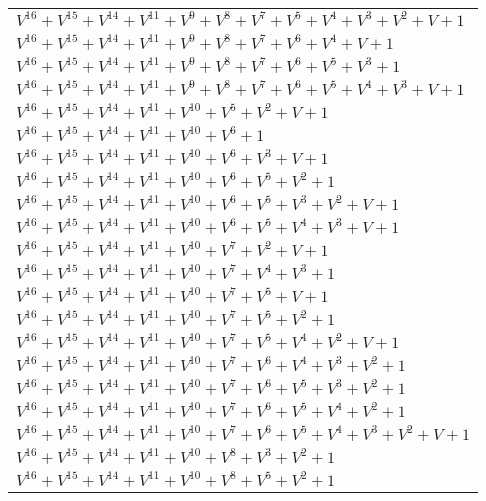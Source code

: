 \documentclass[12pt]{article}
\begin{document}
\begin{adjustwidth}{-4cm}{}
\begin{center}
\begin{longtable}{|l|}
$V^{16}  +V^{15}  +V^{14}  +V^{11}  +V^{9}  +V^{8}  +V^{7}  +V^{5}  +V^{4}  +V^{3}  +V^{2}  + V + 1$ \\
$V^{16}  +V^{15}  +V^{14}  +V^{11}  +V^{9}  +V^{8}  +V^{7}  +V^{6}  +V^{4}  + V + 1$ \\
$V^{16}  +V^{15}  +V^{14}  +V^{11}  +V^{9}  +V^{8}  +V^{7}  +V^{6}  +V^{5}  +V^{3}  + 1$ \\
$V^{16}  +V^{15}  +V^{14}  +V^{11}  +V^{9}  +V^{8}  +V^{7}  +V^{6}  +V^{5}  +V^{4}  +V^{3}  + V + 1$ \\
$V^{16}  +V^{15}  +V^{14}  +V^{11}  +V^{10}  +V^{5}  +V^{2}  + V + 1$ \\
$V^{16}  +V^{15}  +V^{14}  +V^{11}  +V^{10}  +V^{6}  + 1$ \\
$V^{16}  +V^{15}  +V^{14}  +V^{11}  +V^{10}  +V^{6}  +V^{3}  + V + 1$ \\
$V^{16}  +V^{15}  +V^{14}  +V^{11}  +V^{10}  +V^{6}  +V^{5}  +V^{2}  + 1$ \\
$V^{16}  +V^{15}  +V^{14}  +V^{11}  +V^{10}  +V^{6}  +V^{5}  +V^{3}  +V^{2}  + V + 1$ \\
$V^{16}  +V^{15}  +V^{14}  +V^{11}  +V^{10}  +V^{6}  +V^{5}  +V^{4}  +V^{3}  + V + 1$ \\
$V^{16}  +V^{15}  +V^{14}  +V^{11}  +V^{10}  +V^{7}  +V^{2}  + V + 1$ \\
$V^{16}  +V^{15}  +V^{14}  +V^{11}  +V^{10}  +V^{7}  +V^{4}  +V^{3}  + 1$ \\
$V^{16}  +V^{15}  +V^{14}  +V^{11}  +V^{10}  +V^{7}  +V^{5}  + V + 1$ \\
$V^{16}  +V^{15}  +V^{14}  +V^{11}  +V^{10}  +V^{7}  +V^{5}  +V^{2}  + 1$ \\
$V^{16}  +V^{15}  +V^{14}  +V^{11}  +V^{10}  +V^{7}  +V^{5}  +V^{4}  +V^{2}  + V + 1$ \\
$V^{16}  +V^{15}  +V^{14}  +V^{11}  +V^{10}  +V^{7}  +V^{6}  +V^{4}  +V^{3}  +V^{2}  + 1$ \\
$V^{16}  +V^{15}  +V^{14}  +V^{11}  +V^{10}  +V^{7}  +V^{6}  +V^{5}  +V^{3}  +V^{2}  + 1$ \\
$V^{16}  +V^{15}  +V^{14}  +V^{11}  +V^{10}  +V^{7}  +V^{6}  +V^{5}  +V^{4}  +V^{2}  + 1$ \\
$V^{16}  +V^{15}  +V^{14}  +V^{11}  +V^{10}  +V^{7}  +V^{6}  +V^{5}  +V^{4}  +V^{3}  +V^{2}  + V + 1$ \\
$V^{16}  +V^{15}  +V^{14}  +V^{11}  +V^{10}  +V^{8}  +V^{3}  +V^{2}  + 1$ \\
$V^{16}  +V^{15}  +V^{14}  +V^{11}  +V^{10}  +V^{8}  +V^{5}  +V^{2}  + 1$ \\

\end{longtable}
\end{center}
\end{adjustwidth}
\end{document}
